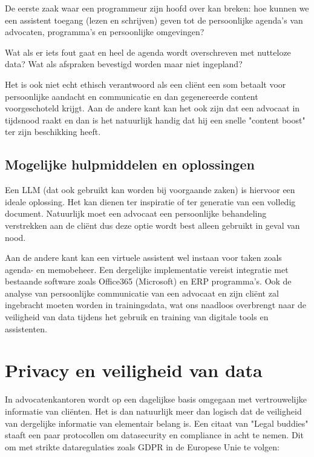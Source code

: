 De eerste zaak waar een programmeur zijn hoofd over kan breken:
hoe kunnen we een assistent toegang (lezen en schrijven) geven tot de persoonlijke agenda's van advocaten, programma's en persoonlijke omgevingen?

Wat als er iets fout gaat en heel de agenda wordt overschreven met nutteloze data?
Wat als afspraken bevestigd worden maar niet ingepland?

Het is ook niet echt ethisch verantwoord als een cliënt een som betaalt voor persoonlijke aandacht en communicatie en dan gegenereerde content voorgeschoteld krijgt.
Aan de andere kant kan het ook zijn dat een advocaat in tijdsnood raakt en dan is het natuurlijk handig dat hij een snelle "content boost" ter zijn beschikking heeft.

\subsection{Mogelijke hulpmiddelen en oplossingen}
Een LLM (dat ook gebruikt kan worden bij voorgaande zaken) is hiervoor een ideale oplossing.
Het kan dienen ter inspiratie of ter generatie van een volledig document.
Natuurlijk moet een advocaat een persoonlijke behandeling verstrekken aan de cliënt dus deze optie wordt best alleen gebruikt in geval van nood.

Aan de andere kant kan een virtuele assistent wel instaan voor taken zoals agenda- en memobeheer.
Een dergelijke implementatie vereist integratie met bestaande software zoals Office365 (Microsoft) en ERP programma's.
Ook de analyse van persoonlijke communicatie van een advocaat en zijn cliënt zal ingebracht moeten worden in trainingsdata,
wat ons naadloos overbrengt naar de veiligheid van data tijdens het gebruik en training van digitale tools en assistenten.

\section{Privacy en veiligheid  van data}
In advocatenkantoren wordt op een dagelijkse basis omgegaan met vertrouwelijke informatie van cliënten.
Het is dan natuurlijk meer dan logisch dat de veiligheid van dergelijke informatie van elementair belang is.
Een citaat van "Legal buddies" staaft een paar protocollen om datasecurity en compliance in acht te nemen.
Dit om met strikte dataregulaties zoals GDPR in de Europese Unie te volgen:

